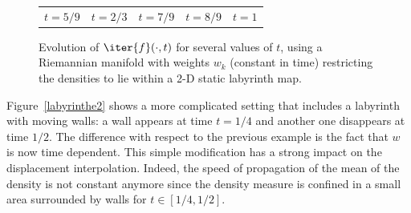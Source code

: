 \begin{figure}[!ht]
\begin{center}
\begin{tabular}{ccccc}
\hspace{-0.2cm}$t=5/9$&
\hspace{-0.4cm}$t=2/3$&
\hspace{-0.4cm}$t=7/9$&
\hspace{-0.4cm}$t=8/9$&\hspace{-0.35cm}$t=1$
\end{tabular}
\caption{\label{labyrinthe} 
Evolution of $\iter{f}(\cdot,t)$ for several values of $t$, using a Riemannian manifold with weights $w_k$ (constant in time) restricting the densities to lie within a 2-D static labyrinth map.  }
\end{center}
\end{figure}


Figure~\ref{labyrinthe2} shows a more complicated setting that includes a labyrinth with moving walls: a wall appears at time $t=1/4$ and another one disappears at time $1/2$. The difference with respect to the previous example is the fact that $w$ is now time dependent. This simple modification has a strong impact on the displacement interpolation. Indeed, the speed of propagation of the mean of the density is not constant anymore since the density measure is confined in a small area surrounded by walls for $t \in [1/4,1/2]$.



